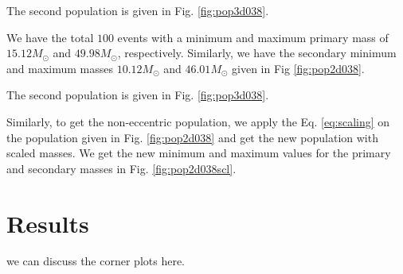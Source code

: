 \documentclass[twocolumn,prd,nofootinbib]{revtex4}
\begin{document}
The second population is given in Fig. \ref{fig:pop3d038}.  



We have the total $100$ events with a minimum and maximum primary mass of $15.12 M_\odot$ and $49.98 M_\odot$, respectively. Similarly, we have the secondary minimum and maximum masses $10.12 M_\odot$ and $46.01 M_\odot$ given in Fig \ref{fig:pop2d038}.


The second population is given in Fig. \ref{fig:pop3d038}.  



Similarly, to get the non-eccentric population, we apply the Eq. \ref{eq:scaling} on the population given in Fig. \ref{fig:pop2d038} and get the new population with scaled masses. We get the new minimum and maximum values for the primary and secondary masses in Fig. \ref{fig:pop2d038scl}. 
   

                            

\section{Results}

we can discuss the corner plots here.
\end{document}

